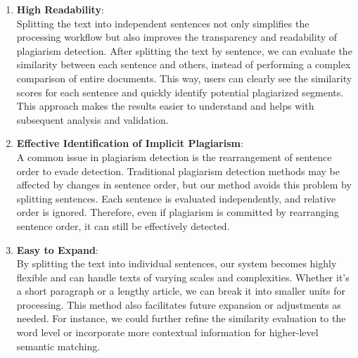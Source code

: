\begin{enumerate}
    \item \textbf{High Readability}: \\
    Splitting the text into independent sentences not only simplifies the processing workflow but also improves the transparency and readability of plagiarism detection. After splitting the text by sentence, we can evaluate the similarity between each sentence and others, instead of performing a complex comparison of entire documents. This way, users can clearly see the similarity scores for each sentence and quickly identify potential plagiarized segments. This approach makes the results easier to understand and helps with subsequent analysis and validation.
    
    \item \textbf{Effective Identification of Implicit Plagiarism}: \\
    A common issue in plagiarism detection is the rearrangement of sentence order to evade detection. Traditional plagiarism detection methods may be affected by changes in sentence order, but our method avoids this problem by splitting sentences. Each sentence is evaluated independently, and relative order is ignored. Therefore, even if plagiarism is committed by rearranging sentence order, it can still be effectively detected.
    
    \item \textbf{Easy to Expand}: \\
    By splitting the text into individual sentences, our system becomes highly flexible and can handle texts of varying scales and complexities. Whether it's a short paragraph or a lengthy article, we can break it into smaller units for processing. This method also facilitates future expansion or adjustments as needed. For instance, we could further refine the similarity evaluation to the word level or incorporate more contextual information for higher-level semantic matching.
\end{enumerate}



